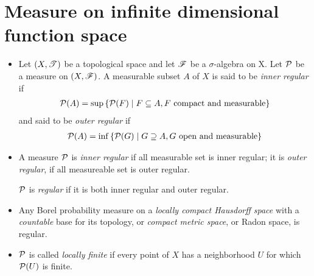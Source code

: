 \documentclass[11pt]{article}
\begin{document}
\section{Measure on infinite dimensional function space}
\begin{itemize}
\item 
\begin{definition}
Let $(X, {\mathscr T})$ be a topological space and let ${\mathscr F}$ be a $\sigma$-algebra on X. Let ${\mathcal P}$ be a measure on $(X, {\mathscr F})$. A measurable subset $A$ of $X$ is said to be \emph{inner regular }if
\begin{align*}
{\mathcal P} (A) = \sup \left\{ {\mathcal P} (F) \;|\; F \subseteq A, F \mbox{ compact and measurable} \right\}
\end{align*} 
and said to be \emph{outer regular} if
\begin{align*}
{\mathcal P} (A) = \inf \left\{ {\mathcal P} (G) \;|\; G \supseteq A, G \mbox{ open and measurable} \right\}
\end{align*} 
\end{definition}

\item A measure ${\mathcal P}$ is \emph{inner regular} if all measurable set is inner regular; it is \emph{outer regular}, if all measureable set is outer regular. 

${\mathcal P}$ is \emph{regular} if it is both inner regular and outer regular. 

\item Any Borel probability measure on a \emph{locally compact Hausdorff space} with a \emph{countable} base for its topology, or \emph{compact metric space}, or Radon space, is regular.


\item ${\mathcal P}$ is called \emph{locally finite} if every point of $X$ has a neighborhood $U$ for which ${\mathcal P}(U)$ is finite.


\end{itemize}
\end{document}
